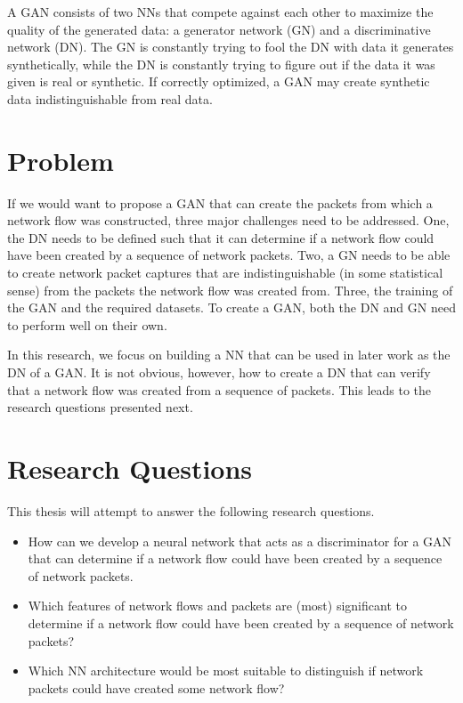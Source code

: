 \documentclass[
	ngerman,
	ruledheaders=section,%
	class=report,%
	thesis={type=bachelor},%
	accentcolor=9c,%
	custommargins=true,%
	marginpar=false,%
	parskip=half-,%
	fontsize=11pt,%
]{tudapub}
\begin{document}
A GAN consists of two NNs that compete against each other to maximize the quality of the generated data:
a generator network (GN) and a discriminative network (DN).
The GN is constantly trying to fool the DN with data it generates synthetically,
while the DN is constantly trying to figure out if the data it was given is real or synthetic.
If correctly optimized, a GAN may create synthetic data indistinguishable from real data.

\section{Problem}

If we would want to propose a GAN that can create the packets from which a network flow was constructed,
three major challenges need to be addressed.
One, the DN needs to be defined such that it can determine if a network flow could have been created by a sequence of network packets.
Two, a GN needs to be able to create network packet captures that are indistinguishable (in some statistical sense) from the packets the network flow was created from.
Three, the training of the GAN and the required datasets.
To create a GAN, both the DN and GN need to perform well on their own.

In this research, we focus on building a NN that can be used in later work as the DN of a GAN.
It is not obvious, however, how to create a DN that
can verify that a network flow was created from a sequence of packets.
This leads to the research questions presented next.

\section{Research Questions}

This thesis will attempt to answer the following research questions.

\begin{itemize}
  \item How can we develop a neural network that acts as a discriminator for a GAN
  that can determine if a network flow could have been created by a sequence of network packets.
  \item Which features of network flows and packets are (most) significant to determine if a network flow could have been created by a sequence of network packets?
  \item Which NN architecture would be most suitable to distinguish if network packets could have created some network flow?
\end{itemize}
\end{document}
